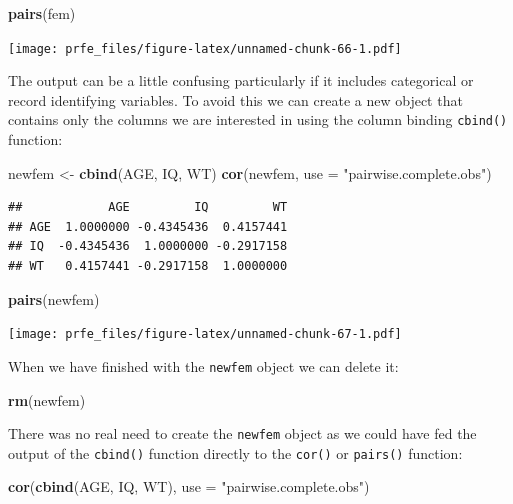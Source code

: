 \documentclass[12pt,]{book}
\newenvironment{Shaded}{\begin{snugshade}}{\end{snugshade}}
\newcommand{\KeywordTok}[1]{\textcolor[rgb]{0.13,0.29,0.53}{\textbf{#1}}}
\newcommand{\DataTypeTok}[1]{\textcolor[rgb]{0.13,0.29,0.53}{#1}}
\newcommand{\StringTok}[1]{\textcolor[rgb]{0.31,0.60,0.02}{#1}}
\newcommand{\NormalTok}[1]{#1}
\theoremstyle{definition}
\theoremstyle{definition}
\theoremstyle{definition}
\theoremstyle{remark}
\begin{document}
\begin{Shaded}
\begin{Highlighting}[]
\KeywordTok{pairs}\NormalTok{(fem)}
\end{Highlighting}
\end{Shaded}

\texttt{[image: prfe\_files/figure-latex/unnamed-chunk-66-1.pdf]}

The output can be a little confusing particularly if it includes
categorical or record identifying variables. To avoid this we can create
a new object that contains only the columns we are interested in using
the column binding \texttt{cbind()} function:

\begin{Shaded}
\begin{Highlighting}[]
\NormalTok{newfem <-}\StringTok{ }\KeywordTok{cbind}\NormalTok{(AGE, IQ, WT)}
\KeywordTok{cor}\NormalTok{(newfem, }\DataTypeTok{use =} \StringTok{"pairwise.complete.obs"}\NormalTok{)}
\end{Highlighting}
\end{Shaded}

\begin{verbatim}
##            AGE         IQ         WT
## AGE  1.0000000 -0.4345436  0.4157441
## IQ  -0.4345436  1.0000000 -0.2917158
## WT   0.4157441 -0.2917158  1.0000000
\end{verbatim}

\begin{Shaded}
\begin{Highlighting}[]
\KeywordTok{pairs}\NormalTok{(newfem)}
\end{Highlighting}
\end{Shaded}

\texttt{[image: prfe\_files/figure-latex/unnamed-chunk-67-1.pdf]}

When we have finished with the \texttt{newfem} object we can delete it:

\begin{Shaded}
\begin{Highlighting}[]
\KeywordTok{rm}\NormalTok{(newfem)}
\end{Highlighting}
\end{Shaded}

There was no real need to create the \texttt{newfem} object as we could
have fed the output of the \texttt{cbind()} function directly to the
\texttt{cor()} or \texttt{pairs()} function:

\begin{Shaded}
\begin{Highlighting}[]
\KeywordTok{cor}\NormalTok{(}\KeywordTok{cbind}\NormalTok{(AGE, IQ, WT), }\DataTypeTok{use =} \StringTok{"pairwise.complete.obs"}\NormalTok{)}
\end{Highlighting}
\end{Shaded}
\end{document}
